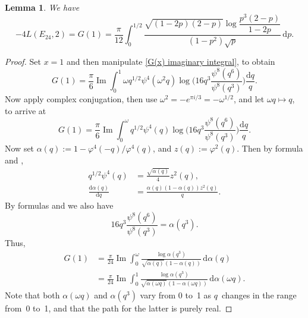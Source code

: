 \documentclass[12pt,reqno]{amsart}
\newtheorem{lemma}{Lemma}
\theoremstyle{remark}
\begin{document}
\begin{lemma}
\label{cor-G1}
We have
\begin{equation}
-4L(E_{24},2)=G(1)
=\frac{\pi}{12}\int_0^{1/2}\frac{\sqrt{(1-2p)(2-p)}\log\dfrac{p^3(2-p)}{1-2p}}{(1-p^2)\sqrt
p}\,{{\mathrm d}} p. \label{G1c}
\end{equation}
\end{lemma}

\begin{proof}
Set $x=1$ and then manipulate \eqref{G(x) imaginary integral}, to obtain
\begin{equation*}
G(1)=\frac{\pi}{6}{\operatorname{Im}}\int_{0}^{1} \omega q^{1/2}\psi^4(\omega^2q)
\log\biggl(16q^{3}\frac{\psi^8(q^{6})}{\psi^8(q^{3})}\biggr)\frac{{{\mathrm d}} q}{q}.
\end{equation*}
Now apply complex conjugation, then use $\omega^2=-e^{\pi i/3}=-\omega^{1/2}$,
and let $\omega q\mapsto q$, to arrive at
\begin{equation*}
G(1)= \frac{\pi}{6}{\operatorname{Im}} \int_{0}^{\omega} q^{1/2}\psi^4(q)
\log\biggl(16q^{3}\frac{\psi^8(q^{6})}{\psi^8(q^{3})}\biggr)\frac{{{\mathrm d}} q}{q}.
\end{equation*}
Now set $\alpha(q):=1-\varphi^4(-q)/\varphi^4(q)$, and
$z(q):=\varphi^2(q)$. Then by formula \cite[pg.~123, Entry
11.1]{Be3} and \cite[pg.~120, Entry 9.1]{Be3},
\begin{align*}
q^{1/2}\psi^4(q)&=\frac{\sqrt{\alpha(q)}}{4}z^2(q),
\\
\frac{{{\mathrm d}} \alpha(q)}{{{\mathrm d}} q}&=\frac{\alpha(q)(1-\alpha(q))z^2(q)}{q}.
\end{align*}
By formulas \cite[pg.~123, Entry 11.1]{Be3} and \cite[pg~123,
Entry 11.3]{Be3} we also have
\begin{equation*}
16q^{3}\frac{\psi^8(q^6)}{\psi^8(q^3)}=\alpha(q^3).
\end{equation*}
Thus,
\begin{align*}
G(1)&=\frac{\pi}{24}{\operatorname{Im}}\int_0^{\omega}\frac{\log\alpha(q^{3})}{\sqrt{\alpha(q)}(1-\alpha(q))}\,{{\mathrm d}}\alpha(q)
\\
&=\frac{\pi}{24}{\operatorname{Im}}\int_0^{1}\frac{\log\alpha(q^{3})}{\sqrt{\alpha(\omega q)}(1-\alpha(\omega q))}\,{{\mathrm d}}\alpha(\omega q).
\end{align*}
Note that both $\alpha(\omega q)$ and $\alpha(q^{3})$ vary from 0 to~1 as $q$~changes
in the range from~0 to~1, and that the path for the latter is purely real.


\end{proof}
\end{document}
